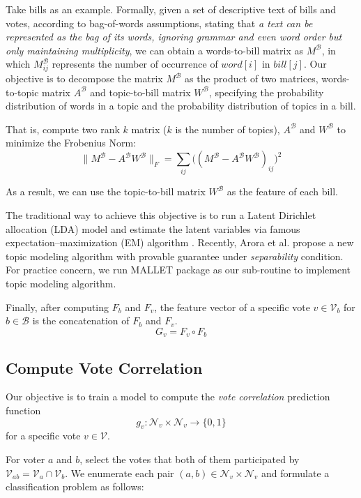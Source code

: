 \documentclass{article} %
\begin{document}
    Take bills as an example. Formally, given a set of descriptive text of bills and votes, according to bag-of-words assumptions, stating that {\em a text can be represented as the bag of its words, ignoring grammar and even word order but only maintaining multiplicity}, we can obtain a words-to-bill matrix as $M^{\mathcal B}$, in which $M_{ij}^{\mathcal B}$ represents the number of occurrence of $word[i]$ in $bill[j]$. Our objective is to decompose the matrix $M^{\mathcal B}$ as the product of two matrices, words-to-topic matrix $A^{\mathcal B}$ and topic-to-bill matrix $W^{\mathcal B}$, specifying the probability distribution of words in a topic and the probability distribution of topics in a bill. 
    
    That is, compute two rank $k$ matrix ($k$ is the number of topics), $A^{\mathcal B}$ and $W^{\mathcal B}$ to minimize the Frobenius Norm:
    \[
        \|M^{\mathcal B} - A^{\mathcal B} W^{\mathcal B}\|_F = \sum_{ij} \big((M^{\mathcal B} - A^{\mathcal B} W^{\mathcal B})_{ij}\big)^2
    \]
    
    
    As a result, we can use the topic-to-bill matrix $W^{\mathcal B}$ as the feature of each bill.
    
    The traditional way to achieve this objective is to run a Latent Dirichlet allocation (LDA) model \cite{blei2003latent} and estimate the latent variables via famous expectation–maximization (EM) algorithm \cite{dempster1977maximum}. Recently, Arora et al. \cite{conf/icml/AroraGHMMSWZ13} propose a new topic modeling algorithm with provable guarantee under {\em separability} condition. For practice concern, we run MALLET package \cite{graham2012getting} as our sub-routine to implement topic modeling algorithm.
     
    Finally, after computing $F_b$ and $F_v$, the feature vector of a specific vote $v \in \mathcal V_b$ for $b \in \mathcal B$ is the concatenation of $F_b$ and $F_v$.
    \[
        G_v = F_v \circ F_b
    \]
    
\subsection{Compute Vote Correlation}
Our objective is to train a model to compute the {\em vote correlation} prediction function 
\[
    g_v: \mathcal N_v \times \mathcal N_v \to \{0, 1\}
\] 
for a specific vote $v \in \mathcal V$. 

For voter $a$ and $b$, select the votes that both of them participated by $\mathcal V_{ab} = \mathcal V_a \cap \mathcal V_b$. We enumerate each pair $(a, b) \in \mathcal N_v \times \mathcal N_v$ and formulate a classification problem as follows:
    
\end{document}
